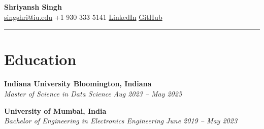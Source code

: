 \documentclass[a4paper,10pt]{article}
\begin{document}
\begin{center}
    \textbf{\LARGE Shriyansh Singh} \\
    \vspace{0.2cm}
    \href{mailto:singshri@iu.edu}{singshri@iu.edu} \textbar{} +1 930 333 5141 \textbar{} \href{https://linkedin.com/in/shriyansh-bir-singh}{LinkedIn} \textbar{} \href{https://github.com/shriyansh24}{GitHub}
\end{center}

\vspace{-0.3cm}

\noindent\rule{\textwidth}{0.5pt}

\vspace{-0.3cm}

\section*{Education}
\noindent\textbf{Indiana University Bloomington, Indiana} \\
\textit{Master of Science in Data Science} \hfill \textit{Aug 2023 – May 2025}

\vspace{0.1cm}

\noindent\textbf{University of Mumbai, India} \\
\textit{Bachelor of Engineering in Electronics Engineering} \hfill \textit{June 2019 – May 2023}

\vspace{-0.3cm}
\end{document}
